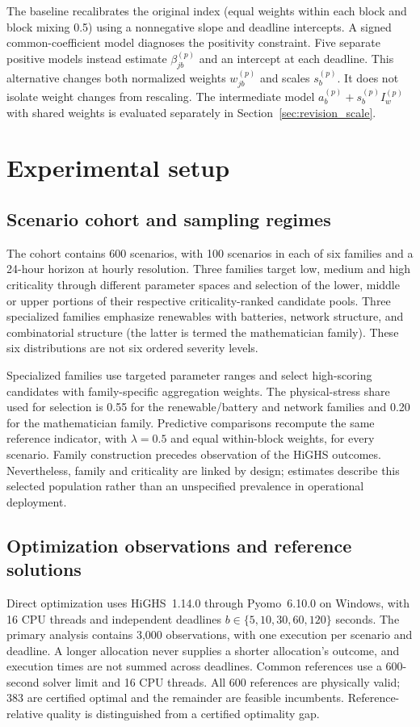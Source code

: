 The baseline recalibrates the original index (equal weights within each
block and block mixing 0.5) using a nonnegative slope and deadline
intercepts. A signed common-coefficient model diagnoses the positivity
constraint. Five separate positive models instead estimate
$\beta^{(p)}_{jb}$ and an intercept at each deadline. This alternative
changes both normalized weights $w^{(p)}_{jb}$ and scales $s^{(p)}_b$.
It does not isolate weight changes from rescaling. The intermediate model
$a^{(p)}_b+s^{(p)}_b I^{(p)}_w$ with shared weights is evaluated separately
in Section~\ref{sec:revision_scale}.



\section{Experimental setup}
\label{sec:setup}
\subsection{Scenario cohort and sampling regimes}
\label{sec:family_design}
The cohort contains 600 scenarios, with 100 scenarios in each of six
families and a 24-hour horizon at hourly resolution. Three families target
low, medium and high criticality through different parameter spaces and
selection of the lower, middle or upper portions of their respective
criticality-ranked candidate pools. Three specialized families emphasize
renewables with batteries, network structure, and combinatorial structure
(the latter is termed the mathematician family). These six distributions
are not six ordered severity levels.

Specialized families use targeted parameter ranges and select high-scoring
candidates with family-specific aggregation weights. The physical-stress
share used for selection is 0.55 for the renewable/battery and network
families and 0.20 for the mathematician family. Predictive comparisons
recompute the same reference indicator, with $\lambda=0.5$ and equal
within-block weights, for every scenario. Family construction precedes
observation of the HiGHS outcomes. Nevertheless, family and criticality are
linked by design; estimates describe this selected population rather than
an unspecified prevalence in operational deployment.

\subsection{Optimization observations and reference solutions}
Direct optimization uses HiGHS~1.14.0 through Pyomo~6.10.0 on Windows,
with 16 CPU threads and independent deadlines
$b\in\{5,10,30,60,120\}$ seconds. The primary analysis contains 3,000
observations, with one execution per scenario and deadline. A longer
allocation never supplies a shorter allocation's outcome, and execution
times are not summed across deadlines. Common references use a 600-second
solver limit and 16 CPU threads. All 600 references are physically valid;
383 are certified optimal and the remainder are feasible incumbents.
Reference-relative quality is distinguished from a certified optimality gap.

